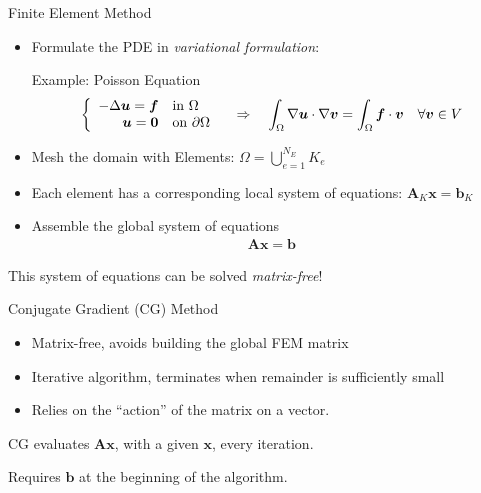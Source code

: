 \documentclass[handout,xcolor=pdftex,table,10pt,yellow,mathserif]{beamer}
\begin{document}
\begin{frame}{Finite Element Method}
    \begin{itemize}
        \item Formulate the PDE in \emph{variational formulation}:
        
        Example: Poisson Equation
        \[
            \left\{ \begin{array}{r l}- \Delta \boldsymbol{u} = \boldsymbol{f} &\text{in} \ \Omega\\
            \boldsymbol{u} = \boldsymbol{0} &\text{on} \ \partial \Omega\end{array}\right. \quad \Rightarrow \quad
            \int_\Omega \nabla \boldsymbol{u} \cdot  \nabla \boldsymbol{v} = \int_\Omega \boldsymbol{f} \cdot \boldsymbol{v} \quad \forall \boldsymbol{v} \in V
        \]

        \pause

        \item Mesh the domain with Elements: $\Omega = \bigcup^{N_E}_{e=1} K_e$
        
        \pause

        \item Each element has a corresponding local system of equations: $\mathbf{A}_K\boldsymbol{x} = \boldsymbol{b}_K$
        
        \pause

        \item Assemble the global system of equations
            \begin{align*}
                \mathbf{A}\boldsymbol{x} = \boldsymbol{b}
            \end{align*}
    \end{itemize}
    \pause

    This system of equations can be solved \emph{matrix-free}!


\end{frame}

\begin{frame}{Conjugate Gradient (CG) Method}
    \begin{itemize}
        \item Matrix-free, avoids building the global FEM matrix
        \item Iterative algorithm, terminates when remainder is sufficiently small
        \item Relies on the ``action'' of the matrix on a vector.
    \end{itemize}

    \pause\vspace{1cm}

    CG evaluates $\mathbf{A}\boldsymbol{x}$, with a given $\boldsymbol{x}$, every iteration.

    Requires $\boldsymbol{b}$ at the beginning of the algorithm.
\end{frame}
\end{document}
